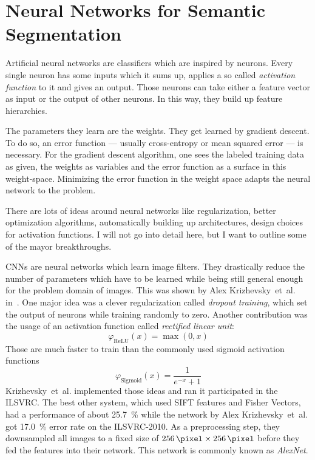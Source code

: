 
\section{Neural Networks for Semantic Segmentation}\label{sec:nn}

Artificial neural networks are classifiers which are inspired by neurons.
Every single neuron has some inputs which it sums up, applies a so called
\textit{activation function} to it and gives an output. Those neurons can take
either a feature vector as input or the output of other neurons. In this way,
they build up feature hierarchies.

The parameters they learn are the weights. They get learned by gradient
descent. To do so, an error function --- usually cross-entropy or mean squared
error --- is necessary. For the gradient descent algorithm, one sees the
labeled training data as given, the weights as variables and the error function
as a surface in this weight-space. Minimizing the error function in the weight
space adapts the neural network to the problem.

There are lots of ideas around neural networks like regularization, better
optimization algorithms, automatically building up architectures, design
choices for activation functions. I will not go into detail here, but I want to
outline some of the mayor breakthroughs.

\Glspl{CNN} are neural networks which learn image filters. They drastically
reduce the number of parameters which have to be learned while being still
general enough for the problem domain of images. This was shown by Alex
Krizhevsky~et~al. in~\cite{krizhevsky2012imagenet}. One major idea was a clever
regularization called \textit{dropout training}, which set the output of neurons
while training randomly to zero. Another contribution was the usage of an activation
function called \textit{rectified linear unit}:
\[\varphi_{\text{ReLU}}(x) = \max(0, x)\]
Those are much faster to train than the commonly used sigmoid activation functions
\[\varphi_{\text{Sigmoid}}(x) = \frac{1}{e^{-x} + 1}\]
Krizhevsky~et~al. implemented those ideas and ran it participated in the
\gls{ILSVRC}. The best other system, which used SIFT features and Fisher
Vectors, had a performance of about \SI{25.7}{\percent} while the network by
Alex Krizhevsky~et~al. got \SI{17.0}{\percent} error rate on the ILSVRC-2010.
As a preprocessing step, they downsampled all images to a fixed
size of $\SI{256}{\pixel} \times \SI{256}{\pixel}$ before they fed the features
into their network. This network is commonly known as \textit{AlexNet}.

